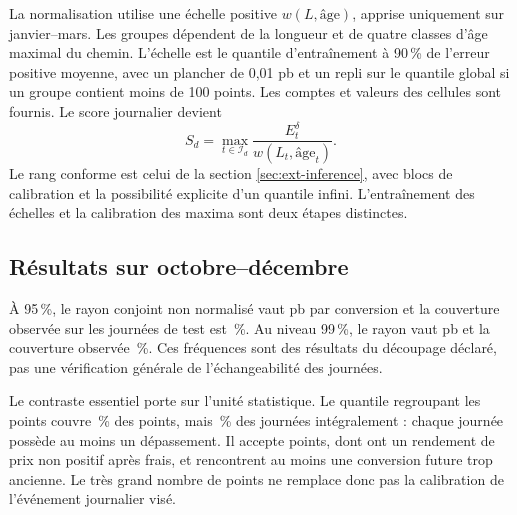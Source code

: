 La normalisation utilise une échelle positive \(w(L,\text{âge})\), apprise uniquement sur janvier--mars. Les groupes dépendent de la longueur et de quatre classes d'âge maximal du chemin. L'échelle est le quantile d'entraînement à 90\,\% de l'erreur positive moyenne, avec un plancher de 0,01 pb et un repli sur le quantile global si un groupe contient moins de 100 points. Les comptes et valeurs des cellules sont fournis. Le score journalier devient
\[
 S_d=\max_{t\in\mathcal I_d}\frac{E_t^\delta}{w(L_t,\text{âge}_t)}.
\]
Le rang conforme est celui de la section \ref{sec:ext-inference}, avec \EmpHistCal{} blocs de calibration et la possibilité explicite d'un quantile infini. L'entraînement des échelles et la calibration des maxima sont deux étapes distinctes.

\subsection{Résultats sur octobre--décembre}

\begin{table}[H]\centering\small

\caption{Cible du dernier prix archivé, délai de 100 ms. Le rayon est exprimé en pb par conversion et moyenné sur les candidats du test pour la méthode normalisée. La couverture concerne les blocs ; les acceptations sont des points de grille, pas des trades indépendants.}
\end{table}

À 95\,\%, le rayon conjoint non normalisé vaut \EmpNinetyFiveRadius{} pb par conversion et la couverture observée sur les \EmpHistTest{} journées de test est \EmpNinetyFiveCoverage{}\,\%. Au niveau 99\,\%, le rayon vaut \EmpNinetyNineRadius{} pb et la couverture observée \EmpNinetyNineCoverage{}\,\%. Ces fréquences sont des résultats du découpage déclaré, pas une vérification générale de l'échangeabilité des journées.

Le contraste essentiel porte sur l'unité statistique. Le quantile regroupant les points couvre \EmpPooledPointCoverage{}\,\% des points, mais \EmpPooledBlockCoverage{}\,\% des journées intégralement : chaque journée possède au moins un dépassement. Il accepte \EmpPooledAccept{} points, dont \EmpPooledLosses{} ont un rendement de prix non positif après frais, et \EmpPooledUnfresh{} rencontrent au moins une conversion future trop ancienne. Le très grand nombre de points ne remplace donc pas la calibration de l'événement journalier visé.

